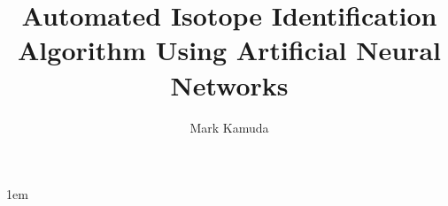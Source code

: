 \documentclass[thesis,tocnosub,noragright,centerchapter,12pt]{uiucecethesis09}
\title{Automated Isotope Identification Algorithm Using Artificial Neural Networks}
\author{Mark Kamuda}
\begin{document}
%

\maketitle
\parindent 1em%
\frontmatter

\begin{abstract}

\end{abstract}



\begin{acknowledgments}

\end{acknowledgments}

\tableofcontents

\listoftables

\listoffigures

\end{document}
